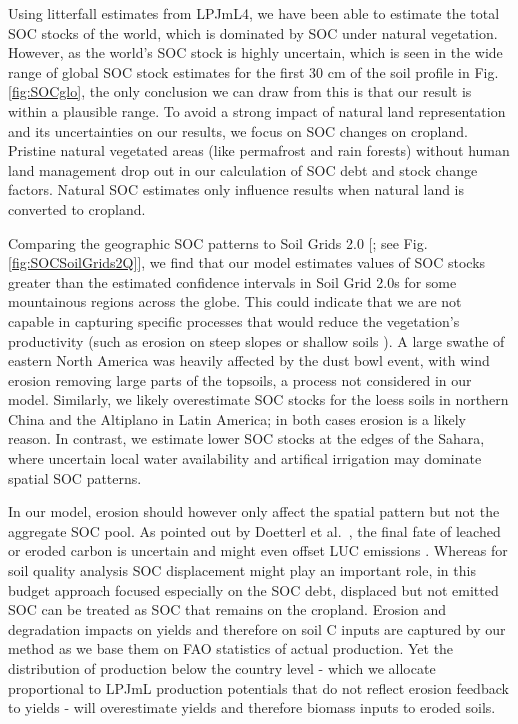 \documentclass[gc, manuscript]{copernicus}
\begin{document}
Using litterfall estimates from LPJmL4, we have been able to estimate the total SOC stocks of the world, which is dominated by SOC under natural vegetation. However, as the world's SOC stock is highly uncertain, which is seen in the wide range of global SOC stock estimates for the first 30 cm of the soil profile \citep{batjes_harmonized_2016, hengl_soilgrids250m_2017, fao_global_2018, schaphoff_lpjml4_2018-1, poggio_soilgrids_2021, sanderman_soil_2017} in Fig. \ref{fig:SOCglo}, the only conclusion we can draw from this is that our result is within a plausible range.
To avoid a strong impact of natural land representation and its uncertainties on our results, we focus on SOC changes on cropland. Pristine natural vegetated areas (like permafrost and rain forests) without human land management drop out in our calculation of SOC debt and stock change factors. Natural SOC estimates only influence results when natural land is converted to cropland.

Comparing the geographic SOC patterns to Soil Grids 2.0 {[}\citet{poggio_soilgrids_2021}; see Fig. \ref{fig:SOCSoilGrids2Q}{]}, we find that our model estimates values of SOC stocks greater than the estimated confidence intervals in Soil Grid 2.0s for some mountainous regions across the globe. This could indicate that we are not capable in capturing specific processes that would reduce the vegetation's productivity (such as erosion on steep slopes or shallow soils \citep{borrelli_assessment_2017}). A large swathe of eastern North America was heavily affected by the dust bowl event, with wind erosion removing large parts of the topsoils, a process not considered in our model. Similarly, we likely overestimate SOC stocks for the loess soils in northern China and the Altiplano in Latin America; in both cases erosion is a likely reason. In contrast, we estimate lower SOC stocks at the edges of the Sahara, where uncertain local water availability and artifical irrigation may dominate spatial SOC patterns.

In our model, erosion should however only affect the spatial pattern but not the aggregate SOC pool. As pointed out by Doetterl et al.~\citeyearpar{doetterl_erosion_2016}, the final fate of leached or eroded carbon is uncertain and might even offset LUC emissions \citep{wang_human-induced_2017}. Whereas for soil quality analysis SOC displacement might play an important role, in this budget approach focused especially on the SOC debt, displaced but not emitted SOC can be treated as SOC that remains on the cropland. Erosion and degradation impacts on yields and therefore on soil C inputs are captured by our method as we base them on FAO statistics of actual production. Yet the distribution of production below the country level - which we allocate proportional to LPJmL production potentials that do not reflect erosion feedback to yields - will overestimate yields and therefore biomass inputs to eroded soils.
\end{document}
